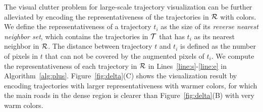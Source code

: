 



The visual clutter problem for large-scale trajectory visualization can be further alleviated by encoding the representativeness of the trajectories in $\mathcal{R}$ with colors.
We define the representativeness of a trajectory $t_i$ as the size of its \emph{reverse nearest neighbor set}, which contains the trajectories in $\mathcal{T}$ that has $t_i$ as its nearest neighbor in $\mathcal{R}$.
The distance between trajectory $t$ and $t_i$ is defined as the number of pixels in $t$ that can not be covered by the augmented pixels of $t_i$.
We compute the representativeness of each trajectory in $\mathcal{R}$ in Lines~\ref{line:s}-\ref{line:e} in Algorithm~\ref{alg:plus}.
Figure~\ref{fig:delta}(C) shows the visualization result by encoding trajectories with larger representativeness with warmer colors, for which the main roads in the dense region is clearer than Figure~\ref{fig:delta}(B) with very warm colors.










